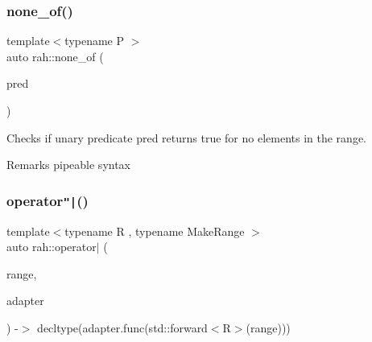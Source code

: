 \begin{DoxyCodeInclude}{0}
\DoxyCodeLine{        ));}
\end{DoxyCodeInclude}
\mbox{\label{namespacerah_aa05e58774ee8e9e05cd3e6ed2a2fa372}} 
\subsubsection{\texorpdfstring{none\_of()}{none\_of()}\hspace{0.1cm}{\footnotesize\ttfamily [2/2]}}
{\footnotesize\ttfamily template$<$typename P $>$ \\
auto rah\+::none\+\_\+of (\begin{DoxyParamCaption}\item[{P \&\&}]{pred }\end{DoxyParamCaption})}



Checks if unary predicate pred returns true for no elements in the range. 

\begin{DoxyRemark}{Remarks}
pipeable syntax
\end{DoxyRemark}

\begin{DoxyCodeInclude}{0}
\DoxyCodeLine{        ) == \textcolor{keyword}{false});}
\end{DoxyCodeInclude}
\mbox{\label{namespacerah_a5ebb23bb276c853ef14a86bed84b6df9}} 
\subsubsection{\texorpdfstring{operator\texttt{"|}()}{operator|()}}
{\footnotesize\ttfamily template$<$typename R , typename Make\+Range $>$ \\
auto rah\+::operator$\vert$ (\begin{DoxyParamCaption}\item[{R \&\&}]{range,  }\item[{\mbox{\hyperlink{structrah_1_1pipeable}{pipeable}}$<$ Make\+Range $>$ const \&}]{adapter }\end{DoxyParamCaption}) -\/$>$ decltype(adapter.\+func(std\+::forward$<$R$>$(range)))
}

